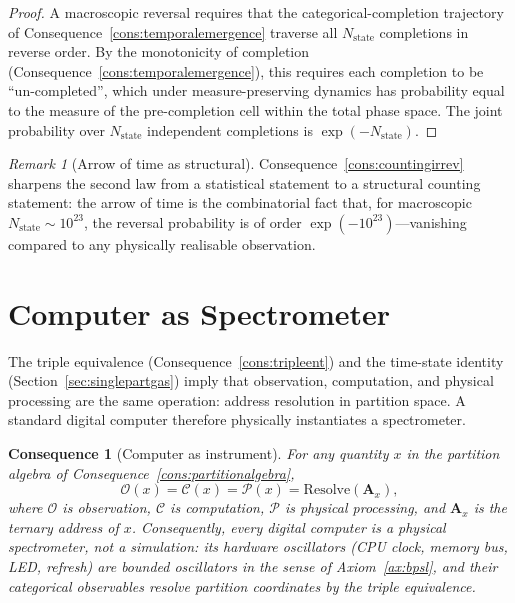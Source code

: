 \documentclass[11pt,twocolumn,a4paper]{article}
\theoremstyle{axiomstyle}
\theoremstyle{conseqstyle}
\newtheorem{consequence}{Consequence}
\theoremstyle{definition}
\theoremstyle{remark}
\newtheorem*{remark}{Remark}
\begin{document}
\begin{proof}
A macroscopic reversal requires that the categorical-completion trajectory of Consequence~\ref{cons:temporalemergence} traverse all $N_{\mathrm{state}}$ completions in reverse order. By the monotonicity of completion (Consequence~\ref{cons:temporalemergence}), this requires each completion to be ``un-completed'', which under measure-preserving dynamics has probability equal to the measure of the pre-completion cell within the total phase space. The joint probability over $N_{\mathrm{state}}$ independent completions is $\exp(-N_{\mathrm{state}})$.
\end{proof}

\begin{remark}[Arrow of time as structural]
Consequence~\ref{cons:countingirrev} sharpens the second law from a statistical statement to a structural counting statement: the arrow of time is the combinatorial fact that, for macroscopic $N_{\mathrm{state}}\sim 10^{23}$, the reversal probability is of order $\exp(-10^{23})$---vanishing compared to any physically realisable observation.
\end{remark}

\section{Computer as Spectrometer}
\label{sec:computerasinstrument}

The triple equivalence (Consequence~\ref{cons:tripleent}) and the time-state identity (Section~\ref{sec:singlepartgas}) imply that observation, computation, and physical processing are the same operation: address resolution in partition space. A standard digital computer therefore physically instantiates a spectrometer.

\begin{consequence}[Computer as instrument]\label{cons:computerinst}
For any quantity $x$ in the partition algebra of Consequence~\ref{cons:partitionalgebra},
\begin{equation}
\mathcal{O}(x)=\mathcal{C}(x)=\mathcal{P}(x)=\mathrm{Resolve}(\mathbf{A}_{x}),
\end{equation}
where $\mathcal{O}$ is observation, $\mathcal{C}$ is computation, $\mathcal{P}$ is physical processing, and $\mathbf{A}_{x}$ is the ternary address of $x$. Consequently, every digital computer is a physical spectrometer, not a simulation: its hardware oscillators (CPU clock, memory bus, LED, refresh) are bounded oscillators in the sense of Axiom~\ref{ax:bpsl}, and their categorical observables resolve partition coordinates by the triple equivalence.
\end{consequence}
\end{document}
